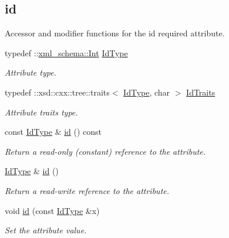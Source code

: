 \subsection*{id}
\label{_amgrpb80bb7740288fda1f201890375a60c8f}
Accessor and modifier functions for the id required attribute. \begin{DoxyCompactItemize}
\item 
\hypertarget{classopenstack_1_1xml_1_1Flavor_a5f67ffcd9c22c43c1b57ff8c8f169bf1}{
typedef ::\hyperlink{namespacexml__schema_a12d975a13061c938969b2b5143e97645}{xml\_\-schema::Int} \hyperlink{classopenstack_1_1xml_1_1Flavor_a5f67ffcd9c22c43c1b57ff8c8f169bf1}{IdType}}
\label{classopenstack_1_1xml_1_1Flavor_a5f67ffcd9c22c43c1b57ff8c8f169bf1}

\begin{DoxyCompactList}\small\item\em Attribute type. \item\end{DoxyCompactList}\item 
\hypertarget{classopenstack_1_1xml_1_1Flavor_af9aab2ec98c1679b1173054622877385}{
typedef ::xsd::cxx::tree::traits$<$ \hyperlink{classopenstack_1_1xml_1_1Flavor_a5f67ffcd9c22c43c1b57ff8c8f169bf1}{IdType}, char $>$ \hyperlink{classopenstack_1_1xml_1_1Flavor_af9aab2ec98c1679b1173054622877385}{IdTraits}}
\label{classopenstack_1_1xml_1_1Flavor_af9aab2ec98c1679b1173054622877385}

\begin{DoxyCompactList}\small\item\em Attribute traits type. \item\end{DoxyCompactList}\item 
const \hyperlink{classopenstack_1_1xml_1_1Flavor_a5f67ffcd9c22c43c1b57ff8c8f169bf1}{IdType} \& \hyperlink{classopenstack_1_1xml_1_1Flavor_acd0ef216f7346d9bed6409546431c14d}{id} () const 
\begin{DoxyCompactList}\small\item\em Return a read-\/only (constant) reference to the attribute. \item\end{DoxyCompactList}\item 
\hyperlink{classopenstack_1_1xml_1_1Flavor_a5f67ffcd9c22c43c1b57ff8c8f169bf1}{IdType} \& \hyperlink{classopenstack_1_1xml_1_1Flavor_a6a3396279b2a9b8977f2a16a4918a22a}{id} ()
\begin{DoxyCompactList}\small\item\em Return a read-\/write reference to the attribute. \item\end{DoxyCompactList}\item 
void \hyperlink{classopenstack_1_1xml_1_1Flavor_a3dcf097d9a00ae775269bdb6d42396a4}{id} (const \hyperlink{classopenstack_1_1xml_1_1Flavor_a5f67ffcd9c22c43c1b57ff8c8f169bf1}{IdType} \&x)
\begin{DoxyCompactList}\small\item\em Set the attribute value. \item\end{DoxyCompactList}\end{DoxyCompactItemize}
